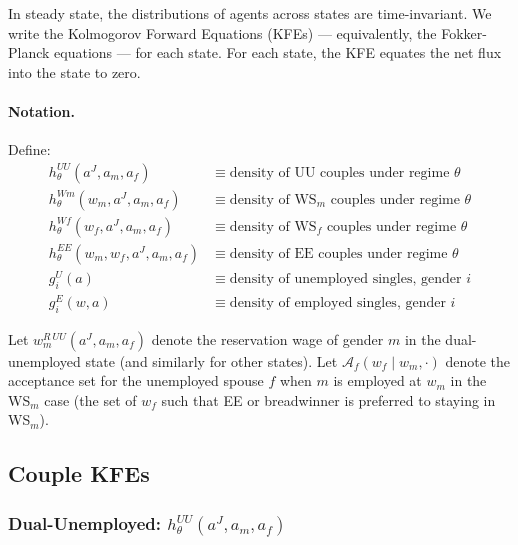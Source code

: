 \documentclass[11pt]{article}
\newcommand{\aJ}{a^{J}}
\newcommand{\wR}{w^{R}}
\begin{document}
In steady state, the distributions of agents across states are time-invariant. We write the Kolmogorov Forward Equations (KFEs) --- equivalently, the Fokker-Planck equations --- for each state. For each state, the KFE equates the net flux into the state to zero.

\paragraph{Notation.} Define:
\begin{align*}
    h_\theta^{UU}(\aJ, a_m, a_f) &\equiv \text{density of UU couples under regime } \theta \\
    h_\theta^{Wm}(w_m, \aJ, a_m, a_f) &\equiv \text{density of WS$_m$ couples under regime } \theta \\
    h_\theta^{Wf}(w_f, \aJ, a_m, a_f) &\equiv \text{density of WS$_f$ couples under regime } \theta \\
    h_\theta^{EE}(w_m, w_f, \aJ, a_m, a_f) &\equiv \text{density of EE couples under regime } \theta \\
    g_i^U(a) &\equiv \text{density of unemployed singles, gender } i \\
    g_i^E(w, a) &\equiv \text{density of employed singles, gender } i
\end{align*}

Let $\wR_m^{UU}(\aJ, a_m, a_f)$ denote the reservation wage of gender $m$ in the dual-unemployed state (and similarly for other states). Let $\mathcal{A}_f(w_f \mid w_m, \cdot)$ denote the acceptance set for the unemployed spouse $f$ when $m$ is employed at $w_m$ in the WS$_m$ case (the set of $w_f$ such that EE or breadwinner is preferred to staying in WS$_m$).

\subsection{Couple KFEs}

\subsubsection{Dual-Unemployed: $h_\theta^{UU}(\aJ, a_m, a_f)$}
\end{document}
